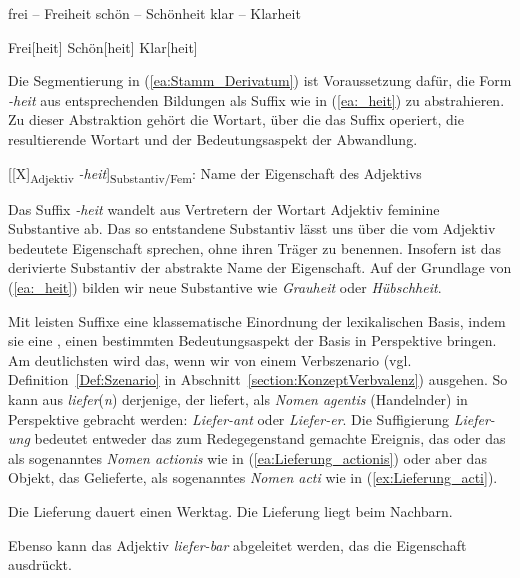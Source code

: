 \ea \label{ea:einfach_komplex}
\ea \label{ea:frei_freiheit} frei -- Freiheit
\ex \label{ex:schön_schönheit} schön -- Schönheit
\ex \label{ex:klar_klarheit} klar -- Klarheit
\z 
\z 

\ea \label{ea:Stamm_Derivatum}
\ea \label{ea:frei_heit} Frei[heit]
\ex \label{ex:schön_heit} Schön[heit]
\ex \label{ex:klar_heit} Klar[heit]
\z 
\z 

Die Segmentierung in (\ref{ea:Stamm_Derivatum}) ist Voraussetzung dafür, die Form \textit{-heit} aus entsprechenden Bildungen als Suffix wie in (\ref{ea:_heit}) zu abstrahieren. Zu dieser Abstraktion gehört die Wortart, über die das Suffix operiert, die resultierende Wortart und der Bedeutungsaspekt der Abwandlung. 

\ea \label{ea:_heit} [[X]\textsubscript{Adjektiv} \textit{-heit}]\textsubscript{Substantiv/Fem}: Name der Eigenschaft des Adjektivs
\z  

Das Suffix \textit{-heit} wandelt aus Vertretern der Wortart Adjektiv feminine Substantive ab. Das so entstandene Substantiv lässt uns über die vom Adjektiv bedeutete Eigenschaft sprechen, ohne ihren Träger zu benennen. Insofern ist das derivierte Substantiv der abstrakte Name der Eigenschaft. Auf der Grundlage von (\ref{ea:_heit}) bilden wir neue Substantive wie \textit{Grauheit} oder \textit{Hübschheit}. 

Mit \citet[34]{Eichinger2000} leisten Suffixe eine klassematische Einordnung der lexikalischen Basis, indem sie eine , einen bestimmten Bedeutungsaspekt der Basis in Perspektive bringen. Am deutlichsten wird das, wenn wir von einem Verbszenario (vgl. Definition~\ref{Def:Szenario} in Abschnitt~\ref{section:KonzeptVerbvalenz}) ausgehen. So kann aus \textit{liefer}(\textit{n}) derjenige, der liefert, als \textit{Nomen agentis} (Handelnder) in Perspektive gebracht werden: \textit{Liefer-ant} oder \textit{Liefer-er}. Die Suffigierung \textit{Liefer-ung} bedeutet entweder das zum Redegegenstand gemachte Ereignis, das  oder das  als sogenanntes \textit{Nomen actionis} wie in (\ref{ea:Lieferung_actionis}) oder aber das Objekt, das Gelieferte, als sogenanntes \textit{Nomen acti} wie in (\ref{ex:Lieferung_acti}). 

\ea \label{ea:nomen_actionis_acti}
\ea \label{ea:Lieferung_actionis} Die Lieferung dauert einen Werktag. 
\ex \label{ex:Lieferung_acti} Die Lieferung liegt beim Nachbarn.
\z 
\z 

Ebenso kann das Adjektiv \textit{liefer-bar} abgeleitet werden, das die Eigenschaft  ausdrückt. 


